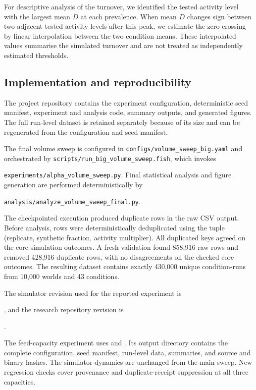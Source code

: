\documentclass[runningheads]{llncs}
\begin{document}
For descriptive analysis of the turnover, we identified the tested activity level with the largest mean \(D\) at each prevalence. When mean \(D\) changes sign between two adjacent tested activity levels after this peak, we estimate the zero crossing by linear interpolation between the two condition means. These interpolated values summarise the simulated turnover and are not treated as independently estimated thresholds.

\subsection{Implementation and reproducibility}

The project repository contains the experiment configuration, deterministic seed manifest, experiment and analysis code, summary outputs, and generated figures. The full run-level dataset is retained separately because of its size and can be regenerated from the configuration and seed manifest.

The final volume sweep is configured in \texttt{configs/volume\_sweep\_big.yaml} and orchestrated by \texttt{scripts/run\_big\_volume\_sweep.fish}, which invokes 

\texttt{experiments/alpha\_volume\_sweep.py}. Final statistical analysis and figure generation are performed deterministically by 

\texttt{analysis/analyze\_volume\_sweep\_final.py}.

The checkpointed execution produced duplicate rows in the raw CSV output. Before analysis, rows were deterministically deduplicated using the tuple (replicate, synthetic fraction, activity multiplier). All duplicated keys agreed on the core simulation outcomes. A fresh validation found 858,916 raw rows and removed 428,916 duplicate rows, with no disagreements on the checked core outcomes. The resulting dataset contains exactly 430,000 unique condition-runs from 10,000 worlds and 43 conditions.

The simulator revision used for the reported experiment is 

, and the research repository revision is

.

The feed-capacity experiment uses
and . Its output directory contains the complete configuration, seed manifest, run-level data, summaries, and source and binary hashes. The simulator dynamics are unchanged from the main sweep. New regression checks cover provenance and duplicate-receipt suppression at all three capacities.
\end{document}
